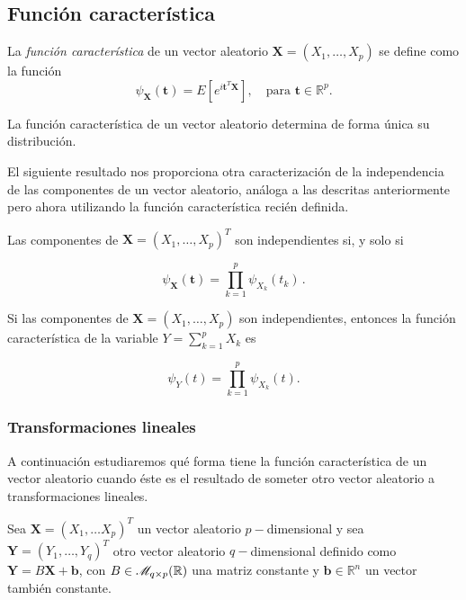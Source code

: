 \subsection{Función característica}

\begin{ndef} \label{funcioncaracteristica}
    La \emph{función característica} de un vector aleatorio \(\boldsymbol X = (X_1,\dots,X_p)\) se define como la función \[\psi_{\boldsymbol X}(\boldsymbol t)=E\left[e^{i\boldsymbol t^T\boldsymbol X}\right], \quad\text{para } \boldsymbol t\in \mathbb{R}^p.\]
\end{ndef}

\begin{nth}[Unicidad]
  La función característica de un vector aleatorio determina de forma única su distribución.
\end{nth}

El siguiente resultado nos proporciona otra caracterización de la independencia de las componentes de un vector aleatorio, análoga a las descritas anteriormente pero ahora utilizando la función característica recién definida.

\begin{nprop}
  Las componentes de \(\boldsymbol X=(X_1,\dots,X_p)^T\) son independientes si, y solo si

  \[
    \psi_{\boldsymbol X}(\boldsymbol t) = \prod_{k=1}^p\psi_{X_k}(t_k)\,
  .\]
\end{nprop}

\begin{nprop}
  Si las componentes de \(\boldsymbol X=(X_1,\dots, X_p)\) son independientes, entonces la función característica de la variable $Y=\sum_{k=1}^p X_k$ es

  \[
    \psi_{Y}(t) = \prod_{k=1}^p\psi_{X_k}(t)
  .\]
\end{nprop}

\subsubsection{Transformaciones lineales}

A continuación estudiaremos qué forma tiene la función característica de un vector aleatorio cuando éste es el resultado de someter otro vector aleatorio a transformaciones lineales.

Sea $\boldsymbol X = (X_1, \dots X_p)^T$ un vector aleatorio $p-$dimensional y sea $\boldsymbol Y = (Y_1,\dots,Y_q)^T$ otro vector aleatorio $q-$dimensional definido como $\boldsymbol Y = B\boldsymbol X + \boldsymbol b$, con $B \in \mathscr{M}_{q\times p}(\mathbb{R})$ una matriz constante y $\boldsymbol b\in \mathbb R ^n$ un vector también constante.

